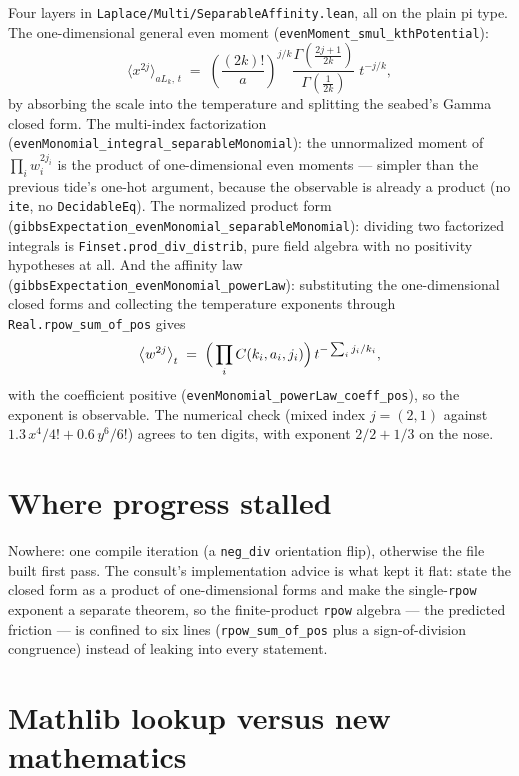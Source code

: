 \documentclass[11pt]{article}
\newcommand{\code}[1]{\texttt{#1}}
\begin{document}
Four layers in \code{Laplace/Multi/SeparableAffinity.lean}, all on
the plain pi type. The one-dimensional general even moment
(\code{evenMoment\_smul\_kthPotential}):
\[
  \bigl\langle x^{2j} \bigr\rangle_{a L_k,\, t}
  \;=\; \left(\frac{(2k)!}{a}\right)^{j/k}
  \frac{\Gamma\!\left(\tfrac{2j+1}{2k}\right)}
       {\Gamma\!\left(\tfrac{1}{2k}\right)}\; t^{-j/k},
\]
by absorbing the scale into the temperature and splitting the
seabed's Gamma closed form. The multi-index factorization
(\code{evenMonomial\_integral\_separableMonomial}): the unnormalized
moment of $\prod_i w_i^{2j_i}$ is the product of one-dimensional
even moments --- simpler than the previous tide's one-hot argument,
because the observable is already a product (no \code{ite}, no
\code{DecidableEq}). The normalized product form\\
(\code{gibbsExpectation\_evenMonomial\_separableMonomial}): dividing
two factorized integrals is \code{Finset.prod\_div\_distrib}, pure
field algebra with no positivity hypotheses at all. And the affinity
law (\code{gibbsExpectation\_evenMonomial\_powerLaw}): substituting
the one-dimensional closed forms and collecting the temperature
exponents through \code{Real.rpow\_sum\_of\_pos} gives
\[
  \bigl\langle w^{2j} \bigr\rangle_t \;=\;
  \Bigl(\,\prod_i C(k_i, a_i, j_i)\Bigr)\,
  t^{-\sum_i j_i/k_i},
\]
with the coefficient positive
(\code{evenMonomial\_powerLaw\_coeff\_pos}), so the exponent is
observable. The numerical check (mixed index $j = (2,1)$ against
$1.3\,x^4/4! + 0.6\,y^6/6!$) agrees to ten digits, with exponent
$2/2 + 1/3$ on the nose.

\section{Where progress stalled}

Nowhere: one compile iteration (a \code{neg\_div} orientation flip),
otherwise the file built first pass. The consult's implementation
advice is what kept it flat: state the closed form as a product of
one-dimensional forms and make the single-\code{rpow} exponent a
separate theorem, so the finite-product \code{rpow} algebra --- the
predicted friction --- is confined to six lines
(\code{rpow\_sum\_of\_pos} plus a sign-of-division congruence)
instead of leaking into every statement.

\section{Mathlib lookup versus new mathematics}
\end{document}
